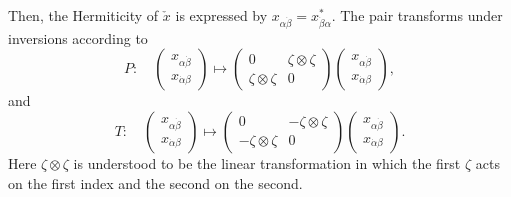Then, the Hermiticity of $\check{x}$ is expressed by
$x_{\alpha\dot\beta}=x_{\dot\beta\alpha}^*$. The pair transforms under
inversions according to
\begin{equation}
  P:\quad
  \begin{pmatrix}
    x_{\alpha\dot\beta}\\
    x_{\dot\alpha\beta}
  \end{pmatrix}
  \longmapsto
  \begin{pmatrix}
    0&\zeta\otimes\zeta\\
    \zeta\otimes\zeta&0
  \end{pmatrix}
  \begin{pmatrix}
    x_{\alpha\dot\beta}\\
    x_{\dot\alpha\beta}
  \end{pmatrix},
  \tag{1-37}\label{eq:ch1-vector-pair-parity}
\end{equation}
and
\begin{equation}
  T:\quad
  \begin{pmatrix}
    x_{\alpha\dot\beta}\\
    x_{\dot\alpha\beta}
  \end{pmatrix}
  \longmapsto
  \begin{pmatrix}
    0&-\zeta\otimes\zeta\\
    -\zeta\otimes\zeta&0
  \end{pmatrix}
  \begin{pmatrix}
    x_{\alpha\dot\beta}\\
    x_{\dot\alpha\beta}
  \end{pmatrix}.
  \tag{1-38}\label{eq:ch1-vector-pair-time-reversal}
\end{equation}
Here $\zeta\otimes\zeta$ is understood to be the linear transformation in
which the first $\zeta$ acts on the first index and the second on the second.

